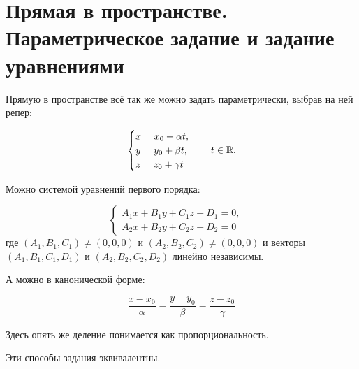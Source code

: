 \section{Прямая в пространстве. Параметрическое задание и задание уравнениями}

Прямую в пространстве всё так же можно задать параметрически, выбрав на ней репер:

$$
\begin{cases}
    x = x_0 + \alpha t,\\
    y = y_0 + \beta t,\\
    z = z_0 + \gamma t
\end{cases}\quad t \in \mathbb{R}.
$$

Можно системой уравнений первого порядка:

$$
\begin{cases}
    A_1x + B_1y + C_1z + D_1 = 0,\\
    A_2x + B_2y + C_2z + D_2 = 0
\end{cases}\quad 
$$
где $(A_1, B_1, C_1) \ne (0, 0, 0)$ и $(A_2, B_2, C_2) \ne (0, 0, 0)$ и векторы $(A_1, B_1, C_1, D_1)$ и $(A_2, B_2, C_2, D_2)$ линейно независимы.

А можно в канонической форме:

$$
\frac{x - x_0}{\alpha} = \frac{y - y_0}{\beta} = \frac{z - z_0}{\gamma}
$$

Здесь опять же деление понимается как пропорциональность.

\begin{statement}
    Эти способы задания эквивалентны.
\end{statement}

